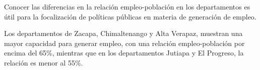 Conocer las diferencias en la relación empleo-población en los departamentos es útil para la focalización de políticas públicas en materia de generación de empleo. 

 Los departamentos de Zacapa, Chimaltenango y Alta Verapaz, muestran una mayor capacidad para generar empleo, con una relación empleo-población por encima del 65\%, mientras que en los departamentos Jutiapa y El Progreso, la relación es menor al 55\%.
